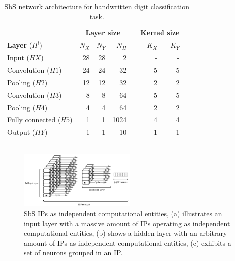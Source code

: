 \begin{table}[t!]\centering
	\caption{SbS network architecture for handwritten digit classification task.}
	\label{tab:sbs_network}
	\scriptsize
	\begin{tabular}{lrrrrrrr}\toprule
		&\multicolumn{3}{c}{\textbf{Layer size}} & &\multicolumn{2}{c}{\textbf{Kernel size}} \\\cmidrule{2-4}\cmidrule{6-7}
		\textbf{Layer} ($H^l$) &$N_X$ &$N_Y$ &$N_H$ & &$K_X$ &$K_Y$ \\\midrule
		Input ($HX$) &28 &28 &2 & &- &- \\
		Convolution ($H1$) &24 &24 &32 & &5 &5 \\
		Pooling ($H2$) &12 &12 &32 & &2 &2 \\
		Convolution ($H3$) &8 &8 &64 & &5 &5 \\
		Pooling ($H4$) &4 &4 &64 & &2 &2 \\
		Fully connected ($H5$) &1 &1 &1024 & &4 &4 \\
		Output ($HY$) &1 &1 &10 & &1 &1 \\
		\bottomrule
	\end{tabular}
\end{table}

\subsection{}



\begin{figure}[t!]
	\centering
	\includegraphics[width=0.5\textwidth]{../figures/SbS_layer.pdf}
	\caption{SbS IPs as independent computational entities, (a) illustrates an input layer with a massive amount of IPs operating as independent computational entities, (b) shows a hidden layer with an arbitrary amount of IPs as independent computational entities, (c) exhibits a set of neurons grouped in an IP.}
	\label{fig:SbS_layer}
\end{figure}



